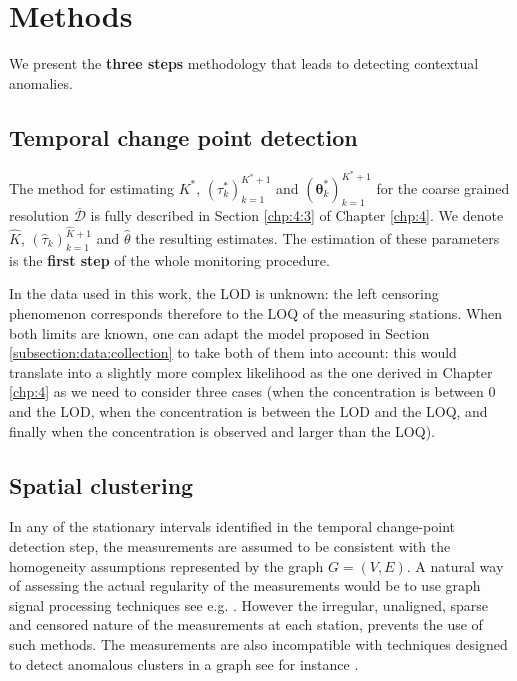 \section{Methods}\label{section:methods}

We present the \textbf{three steps} methodology that leads to detecting contextual anomalies.   

\subsection{Temporal change point detection}

The method for estimating $K^*$, $(\tau^*_k)_{k=1}^{K^*+1}$ and $(\bm\theta^*_k)_{k=1}^{K^*+1}$ for the coarse grained resolution $\overline{\mathcal{D}}$ is fully described in Section \ref{chp:4:3} of Chapter \ref{chp:4}. We denote $\widehat{K}$, $(\widehat{\tau}_k)_{k=1}^{\widehat{K}+1}$ and $\widehat{\theta}$ the resulting estimates. The estimation of these parameters is the \textbf{first step} of the whole monitoring procedure.  

In the data used in this work, the LOD is unknown: the left censoring phenomenon corresponds therefore to the LOQ of the measuring stations. When both limits are known, one can adapt the model proposed in Section \ref{subsection:data:collection} to take both of them into account: this would translate into a slightly more complex likelihood as the one derived in Chapter \ref{chp:4} as we need to consider three cases (when the concentration is between 0 and the LOD, when the concentration is between the LOD and the LOQ, and finally when the concentration is observed and larger than the LOQ).  

\subsection{Spatial clustering}\label{section:spaceclust}

In any of the stationary intervals identified in the temporal change-point detection step, the measurements are assumed to be consistent with the homogeneity assumptions represented by the graph $G=(V, E)$. A natural way of assessing the actual regularity of the measurements would be to use graph signal processing techniques see e.g. \cite{8347162, 6494675}. However the irregular, unaligned, sparse and censored nature of the measurements at each station, prevents the use of such methods. The measurements are also incompatible with techniques designed to detect anomalous clusters in a graph see for instance \cite{10.1214/10-AOS839}.

